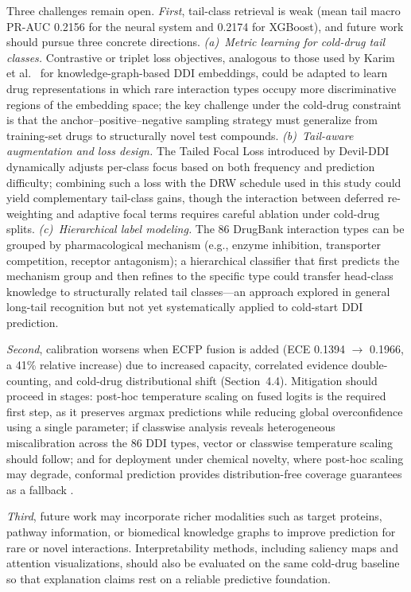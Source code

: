 \documentclass[11pt,a4paper,twocolumn]{article}
\begin{document}
Three challenges remain open.
\textit{First}, tail-class retrieval is weak (mean tail macro PR-AUC 0.2156 for the
neural system and 0.2174 for XGBoost), and future work should pursue three
concrete directions.
\textit{(a)~Metric learning for cold-drug tail classes.}
Contrastive or triplet loss objectives, analogous to those used by Karim et al.\
\cite{karim2019kgddi} for knowledge-graph-based DDI embeddings, could be adapted
to learn drug representations in which rare interaction types occupy more
discriminative regions of the embedding space; the key challenge under the
cold-drug constraint is that the anchor--positive--negative sampling strategy
must generalize from training-set drugs to structurally novel test compounds.
\textit{(b)~Tail-aware augmentation and loss design.}
The Tailed Focal Loss introduced by Devil-DDI \cite{devilddi2024} dynamically
adjusts per-class focus based on both frequency and prediction difficulty;
combining such a loss with the DRW schedule used in this study could yield
complementary tail-class gains, though the interaction between deferred
re-weighting and adaptive focal terms requires careful ablation under
cold-drug splits.
\textit{(c)~Hierarchical label modeling.}
The 86 DrugBank interaction types can be grouped by pharmacological mechanism
(e.g., enzyme inhibition, transporter competition, receptor antagonism);
a hierarchical classifier that first predicts the mechanism group and then
refines to the specific type could transfer head-class knowledge to
structurally related tail classes---an approach explored in general long-tail
recognition \cite{cao2019ldam} but not yet systematically applied to
cold-start DDI prediction.

\textit{Second}, calibration worsens when ECFP fusion is added (ECE 0.1394
$\to$ 0.1966, a 41\% relative increase) due to increased capacity, correlated
evidence double-counting, and cold-drug distributional shift (Section~4.4).
Mitigation should proceed in stages: post-hoc temperature scaling on fused logits
is the required first step, as it preserves argmax predictions while reducing
global overconfidence using a single parameter; if classwise analysis reveals
heterogeneous miscalibration across the 86 DDI types, vector or classwise
temperature scaling should follow; and for deployment under chemical novelty,
where post-hoc scaling may degrade, conformal prediction provides
distribution-free coverage guarantees as a fallback \cite{friesacher2025calibration}.

\textit{Third}, future work may incorporate richer modalities such as target
proteins, pathway information, or biomedical knowledge graphs to improve prediction
for rare or novel interactions.
Interpretability methods, including saliency maps and attention visualizations,
should also be evaluated on the same cold-drug baseline so that explanation claims
rest on a reliable predictive foundation.
\end{document}

